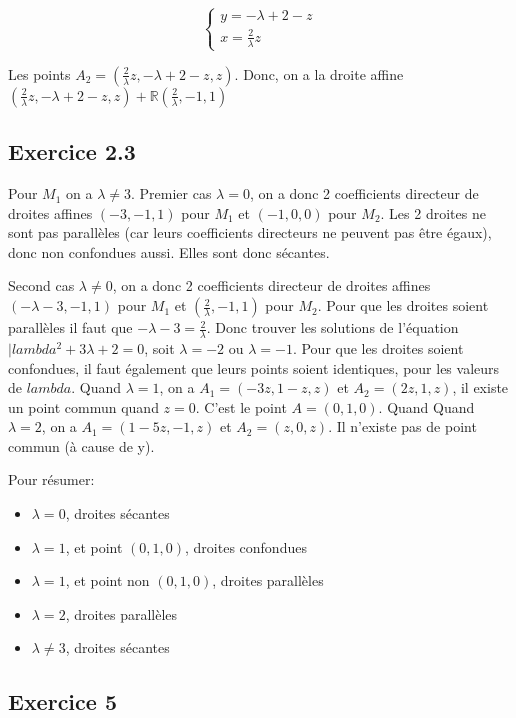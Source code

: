 \documentclass[]{book}
\theoremstyle{definition}
\newcommand{\bb}[1]{\mathbb{#1}}
\newcommand{\R}{\bb{R}}
\begin{document}
$$
\left\{ 
    \begin{array}{l}
        y = -\lambda + 2 - z\\
        x = \frac{2}{\lambda}z
    \end{array}
\right.
$$

Les points $A_2 = (\frac{2}{\lambda}z,-\lambda + 2 - z,z)$. Donc, on a la droite affine $(\frac{2}{\lambda}z,-\lambda + 2 - z,z) + \R(\frac{2}{\lambda},-1,1)$


\subsection*{Exercice 2.3}
Pour $M_1$ on a $\lambda \neq 3$. Premier cas $\lambda = 0$, on a donc 2 coefficients directeur de droites affines $(-3, -1, 1)$ pour $M_1$ et $(-1, 0, 0)$ pour $M_2$. Les 2 droites ne sont pas parall\`eles (car leurs coefficients directeurs ne peuvent pas \^etre \'egaux), donc non confondues aussi. Elles sont donc s\'ecantes.

Second cas $\lambda \neq 0$, on a donc 2 coefficients directeur de droites affines $(-\lambda -3, -1, 1)$ pour $M_1$ et $(\frac{2}{\lambda}, -1, 1)$ pour $M_2$. Pour que les droites soient parall\`eles il faut que $-\lambda -3 = \frac{2}{\lambda}$. Donc trouver les solutions de l'\'equation $|lambda^2 + 3\lambda + 2 = 0$, soit $\lambda = -2$ ou $\lambda = -1$. Pour que les droites soient confondues, il faut \'egalement que leurs points soient identiques, pour les valeurs de $lambda$. Quand $\lambda = 1$, on a $A_1 = (-3z,1-z,z)$ et $A_2 = (2z,1,z)$, il existe un point commun quand $z=0$. C'est le point $A=(0,1,0)$. Quand Quand $\lambda = 2$, on a $A_1 = (1-5z,-1,z)$ et $A_2 = (z,0,z)$. Il n'existe pas de point commun (\`a cause de y).

Pour r\'esumer:
\begin{itemize}
    \item $\lambda = 0$, droites s\'ecantes
    \item $\lambda = 1$, et point $(0,1,0)$, droites confondues
    \item $\lambda = 1$, et point non $(0,1,0)$, droites parall\`eles
    \item $\lambda = 2$, droites parall\`eles
    \item $\lambda \neq 3$, droites s\'ecantes
\end{itemize}

\subsection*{Exercice 5}
\end{document}
